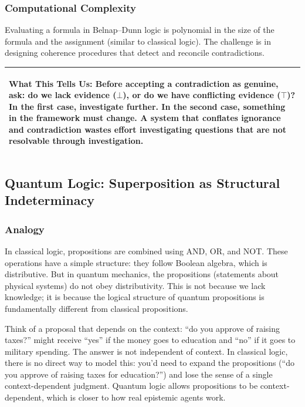 \documentclass[11pt,letterpaper]{article}
\theoremstyle{definition}
\theoremstyle{remark}
\newenvironment{insightbox}{%
  \vspace{0.3cm}%
  \noindent\begin{tabular}{|p{\dimexpr\textwidth-4\tabcolsep-2\arrayrulewidth}|}
  \hline
  \small\itshape\color{accent}
}{%
  \\ \hline
  \end{tabular}
  \vspace{0.3cm}
}
\begin{document}
\subsubsection*{Computational Complexity}

Evaluating a formula in Belnap--Dunn logic is polynomial in the size of the formula and the assignment (similar to classical logic). The challenge is in designing coherence procedures that detect and reconcile contradictions.

\begin{insightbox}
\textbf{What This Tells Us:} Before accepting a contradiction as genuine, ask: do we lack evidence ($\bot$), or do we have conflicting evidence ($\top$)? In the first case, investigate further. In the second case, something in the framework must change. A system that conflates ignorance and contradiction wastes effort investigating questions that are not resolvable through investigation.
\end{insightbox}

\subsection{Quantum Logic: Superposition as Structural Indeterminacy}

\subsubsection*{Analogy}

In classical logic, propositions are combined using AND, OR, and NOT. These operations have a simple structure: they follow Boolean algebra, which is distributive. But in quantum mechanics, the propositions (statements about physical systems) do not obey distributivity. This is not because we lack knowledge; it is because the logical structure of quantum propositions is fundamentally different from classical propositions.

Think of a proposal that depends on the context: ``do you approve of raising taxes?'' might receive ``yes'' if the money goes to education and ``no'' if it goes to military spending. The answer is not independent of context. In classical logic, there is no direct way to model this: you'd need to expand the propositions (``do you approve of raising taxes for education?'') and lose the sense of a single context-dependent judgment. Quantum logic allows propositions to be context-dependent, which is closer to how real epistemic agents work.
\end{document}
